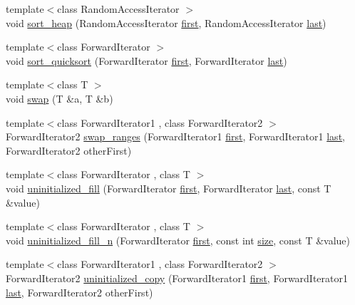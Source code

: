 \begin{DoxyCompactItemize}
\item 
{\footnotesize template$<$class Random\+Access\+Iterator $>$ }\\void \hyperlink{namespaceprism_a1e9fe74c5dcee70bf5dd5c89f1234a02}{sort\+\_\+heap} (Random\+Access\+Iterator \hyperlink{namespaceprism_ae3fb7a1926a9e8e59300cd5e370470da}{first}, Random\+Access\+Iterator \hyperlink{namespaceprism_abe4956c4e865f55ca126b7fb973b5078}{last})
\item 
{\footnotesize template$<$class Forward\+Iterator $>$ }\\void \hyperlink{namespaceprism_a720fbbcb3f399b006969bb00a66686f9}{sort\+\_\+quicksort} (Forward\+Iterator \hyperlink{namespaceprism_ae3fb7a1926a9e8e59300cd5e370470da}{first}, Forward\+Iterator \hyperlink{namespaceprism_abe4956c4e865f55ca126b7fb973b5078}{last})
\item 
{\footnotesize template$<$class T $>$ }\\void \hyperlink{namespaceprism_a6430516ab4f2e2a7f43323acb6b559d8}{swap} (T \&a, T \&b)
\item 
{\footnotesize template$<$class Forward\+Iterator1 , class Forward\+Iterator2 $>$ }\\Forward\+Iterator2 \hyperlink{namespaceprism_a4661f2c0c4dca098c137179b4d93f3dc}{swap\+\_\+ranges} (Forward\+Iterator1 \hyperlink{namespaceprism_ae3fb7a1926a9e8e59300cd5e370470da}{first}, Forward\+Iterator1 \hyperlink{namespaceprism_abe4956c4e865f55ca126b7fb973b5078}{last}, Forward\+Iterator2 other\+First)
\item 
{\footnotesize template$<$class Forward\+Iterator , class T $>$ }\\void \hyperlink{namespaceprism_a8234c2c7917f750db94bb068d6fd554e}{uninitialized\+\_\+fill} (Forward\+Iterator \hyperlink{namespaceprism_ae3fb7a1926a9e8e59300cd5e370470da}{first}, Forward\+Iterator \hyperlink{namespaceprism_abe4956c4e865f55ca126b7fb973b5078}{last}, const T \&value)
\item 
{\footnotesize template$<$class Forward\+Iterator , class T $>$ }\\void \hyperlink{namespaceprism_a5485ae7bad862f6ff0ab363ed4697b61}{uninitialized\+\_\+fill\+\_\+n} (Forward\+Iterator \hyperlink{namespaceprism_ae3fb7a1926a9e8e59300cd5e370470da}{first}, const int \hyperlink{namespaceprism_acd3c0f96adf158a29387191d79c4d874}{size}, const T \&value)
\item 
{\footnotesize template$<$class Forward\+Iterator1 , class Forward\+Iterator2 $>$ }\\Forward\+Iterator2 \hyperlink{namespaceprism_a5ff56f151fea6e709350a0e9fbdb70a8}{uninitialized\+\_\+copy} (Forward\+Iterator1 \hyperlink{namespaceprism_ae3fb7a1926a9e8e59300cd5e370470da}{first}, Forward\+Iterator1 \hyperlink{namespaceprism_abe4956c4e865f55ca126b7fb973b5078}{last}, Forward\+Iterator2 other\+First)

\end{DoxyCompactItemize}
